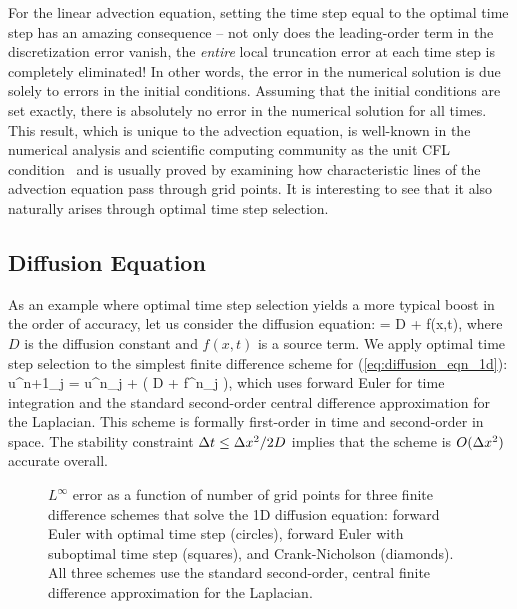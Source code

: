 \documentclass[fleqn,12pt,twoside]{article}
\begin{document}
For the linear advection equation, setting the time step equal to the optimal 
time step has an amazing consequence -- not only does the leading-order term
in the discretization error vanish, the \emph{entire} local truncation 
error at each time step is completely eliminated!  In other words, the error 
in the numerical solution is due solely to errors in the initial conditions.
Assuming that the initial conditions are set exactly, there is absolutely no 
error in the numerical solution for all times.
This result, which is unique to the advection equation, is well-known in the 
numerical analysis and scientific computing community as the unit CFL 
condition~\cite{leveque_book_2002} and is usually proved by examining 
how characteristic lines of the advection equation pass through grid points.  
It is interesting to see that it also naturally arises through optimal time 
step selection.


\subsection{Diffusion Equation \label{sec:diffusion_eqn_1d}}
As an example where optimal time step selection yields a more typical boost 
in the order of accuracy, let us consider the diffusion equation:
\beq
   = D  + f(x,t),
  \label{eq:diffusion_eqn_1d}
\eeq
where $D$ is the diffusion constant and $f(x,t)$ is a source term.  
We apply optimal time step selection to the simplest finite difference 
scheme for (\ref{eq:diffusion_eqn_1d}):
\beq
  u^{n+1}_j = u^{n}_j 
  + \dt 
    \left( D  
         + f^n_j \right),
  \label{eq:diffusion_eqn_1d_FD_scheme}
\eeq
which uses forward Euler for time integration and the standard second-order 
central difference approximation for the Laplacian.
This scheme is formally first-order in time and second-order in space.  
The stability constraint $\Delta t \le \Delta x^2/2D$ implies that the scheme is 
$O(\Delta x^2)$ accurate overall.

\begin{figure}[tb]
\begin{center}
\caption{$L^\infty$ error as a function of number of grid points for three 
finite difference schemes that solve the 1D diffusion equation: forward Euler 
with optimal time step (circles), forward Euler with suboptimal time step
(squares), and Crank-Nicholson (diamonds).  
All three schemes use the standard second-order, central finite difference 
approximation for the Laplacian.  
}
\label{fig:diffusion_eqn_1d_no_src_error}
\end{center}
\end{figure}
\end{document}
